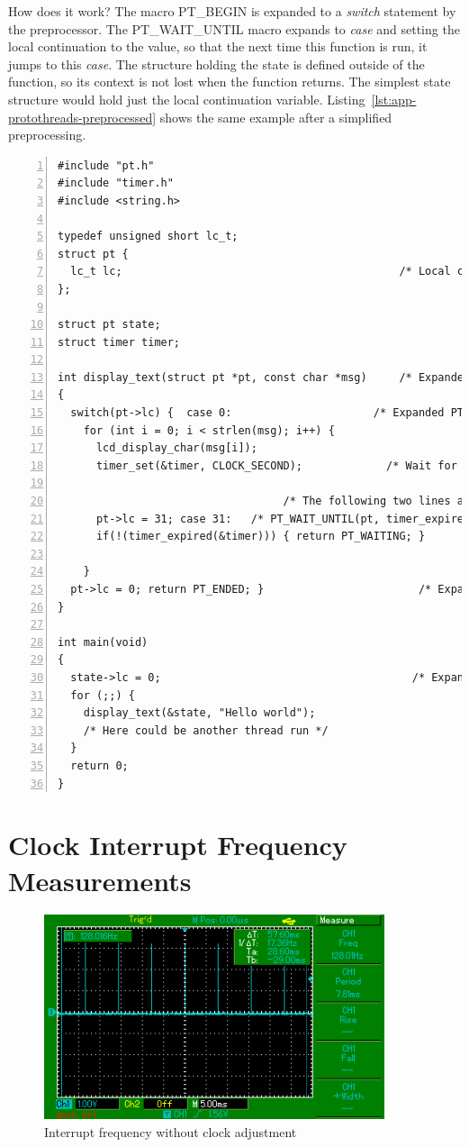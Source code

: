 How does it work? The macro PT\_BEGIN is expanded to a {\it switch} statement
by the preprocessor.
The PT\_WAIT\_UNTIL macro expands to {\it case} and setting the local continuation
to the value, so that the next time this function is run, it jumps to this {\it case}.
The structure holding the state is defined outside of the function, so its context is not lost when
the function returns. The simplest state structure would hold just the local continuation variable.
Listing~\ref{lst:app-protothreads-preprocessed} shows
the same example after a simplified preprocessing.
\begin{lstlisting}[numbers=left,caption={Preprocessed example using Protothreads},label=lst:app-protothreads-preprocessed]
#include "pt.h"
#include "timer.h"
#include <string.h>

typedef unsigned short lc_t;
struct pt {
  lc_t lc;                                           /* Local continuation */
};

struct pt state;
struct timer timer;

int display_text(struct pt *pt, const char *msg)     /* Expanded PT_THREAD */
{
  switch(pt->lc) {  case 0:                      /* Expanded PT_BEGIN(pt); */
    for (int i = 0; i < strlen(msg); i++) {
      lcd_display_char(msg[i]);
      timer_set(&timer, CLOCK_SECOND);             /* Wait for one second. */

                                   /* The following two lines are expanded */
      pt->lc = 31; case 31:   /* PT_WAIT_UNTIL(pt, timer_expired(&timer)); */
      if(!(timer_expired(&timer))) { return PT_WAITING; }         /* macro */

    }
  pt->lc = 0; return PT_ENDED; }                        /* Expanded PT_END */
}

int main(void)
{
  state->lc = 0;                                       /* Expanded PT_INIT */
  for (;;) {
    display_text(&state, "Hello world");
    /* Here could be another thread run */
  }
  return 0;
}
\end{lstlisting}


\chapter{Clock Interrupt Frequency Measurements}\label{app:interrupt-frequency}
\begin{figure}[H]
  \centering
  \includegraphics[width=10cm,keepaspectratio]{fig/osc-no-adjust.png}
  \caption{Interrupt frequency without clock adjustment}
  \label{fig:app-osc-no-adjust}
  \bigskip
\end{figure}

